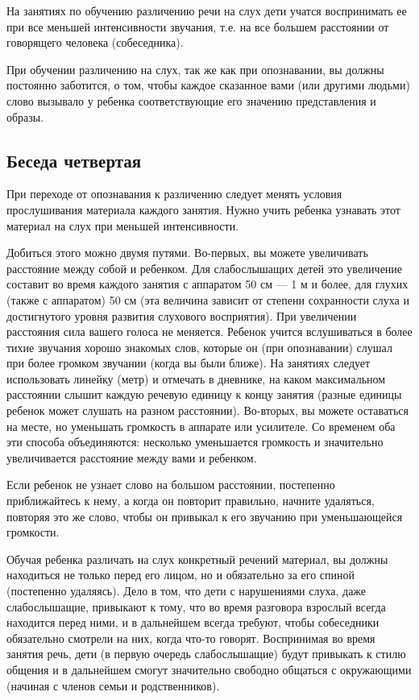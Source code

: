 \documentclass{book}
\begin{document}
На занятиях по обучению различению речи на слух дети учатся воспринимать
ее при все меньшей интенсивности звучания, т.е. на все большем
расстоянии от говорящего человека (собеседника).

При обучении различению на слух, так же как при опознавании, вы должны
постоянно заботится, о том, чтобы каждое сказанное вами (или другими
людьми) слово вызывало у ребенка соответствующие его значению
представления и образы.

\subsection*{Беседа четвертая}

При переходе от опознавания к различению следует менять условия
прослушивания материала каждого занятия. Нужно учить ребенка узнавать
этот материал на слух при меньшей интенсивности.

Добиться этого можно двумя путями. Во-первых, вы можете увеличивать
расстояние между собой и ребенком. Для слабослышащих детей это
увеличение составит во время каждого занятия с аппаратом 50 см --- 1 м и
более, для глухих (также с аппаратом) 50 см (эта величина зависит от
степени сохранности слуха и достигнутого уровня развития слухового
восприятия). При увеличении расстояния сила вашего голоса не меняется.
Ребенок учится вслушиваться в более тихие звучания хорошо знакомых слов,
которые он (при опознавании) слушал при более громком звучании (когда вы
были ближе). На занятиях следует использовать линейку (метр) и отмечать
в дневнике, на каком максимальном расстоянии слышит каждую речевую
единицу к концу занятия (разные единицы ребенок может слушать на разном
расстоянии). Во-вторых, вы можете оставаться на месте, но уменьшать
громкость в аппарате или усилителе. Со временем оба эти способа
объединяются: несколько уменьшается громкость и значительно
увеличивается расстояние между вами и ребенком.

Если ребенок не узнает слово на большом расстоянии, постепенно
приближайтесь к нему, а когда он повторит правильно, начните удаляться,
повторяя это же слово, чтобы он привыкал к его звучанию при
уменьшающейся громкости.

Обучая ребенка различать на слух конкретный речений материал, вы должны
находиться не только перед его лицом, но и обязательно за его спиной
(постепенно удаляясь). Дело в том, что дети с нарушениями слуха, даже
слабослышащие, привыкают к тому, что во время разговора взрослый всегда
находится перед ними, и в дальнейшем всегда требуют, чтобы собеседники
обязательно смотрели на них, когда что-то говорят. Воспринимая во время
занятия речь, дети (в первую очередь слабослышащие) будут привыкать к
стилю общения и в дальнейшем смогут значительно свободно общаться с
окружающими (начиная с членов семьи и родственников).
\end{document}
